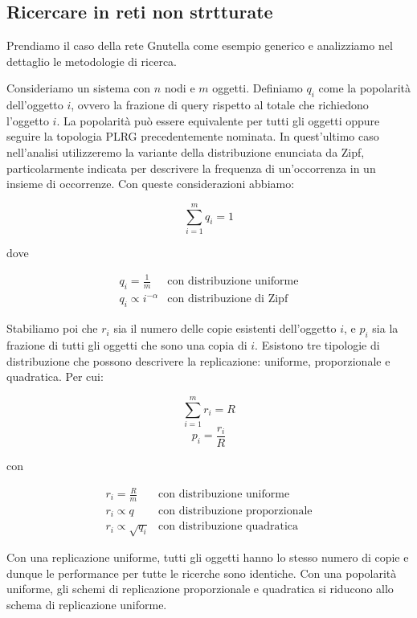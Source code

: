 \subsection{Ricercare in reti non strtturate}\label{ricercare-in-reti-non-strtturate}

Prendiamo il caso della rete Gnutella come esempio generico e analizziamo nel dettaglio le metodologie di ricerca.

Consideriamo un sistema con $n$ nodi e $m$ oggetti. Definiamo $q_i$ come la popolarità dell'oggetto $i$, ovvero la frazione di query rispetto al totale che richiedono l'oggetto $i$. La popolarità può essere equivalente per tutti gli oggetti oppure seguire la topologia PLRG precedentemente nominata. In quest'ultimo caso nell'analisi utilizzeremo la variante della distribuzione enunciata da Zipf, particolarmente indicata per descrivere la frequenza di un'occorrenza in un insieme di occorrenze. 
Con queste considerazioni abbiamo:

\[ \sum^m_{i=1} q_i = 1 \]

dove

\[ \begin{array}{ll} 
    q_i = \frac{1}{m} & \textrm{con distribuzione uniforme} \\
    q_i \propto i^{-\alpha} & \textrm{con distribuzione di Zipf}
    \end{array}
\]

Stabiliamo poi che $r_i$ sia il numero delle copie esistenti dell'oggetto $i$, e $p_i$ sia la frazione di tutti gli oggetti che sono una copia di $i$. Esistono tre tipologie di distribuzione che possono descrivere la replicazione: uniforme, proporzionale e quadratica. Per cui:

\[ \sum^m_{i=1} r_i = R \] \[ p_i = \frac{r_i}{R} \]

con

\[ \begin{array}{ll} 
    r_i = \frac{R}{m} & \textrm{con distribuzione uniforme} \\
    r_i \propto q & \textrm{con distribuzione proporzionale} \\
    r_i \propto \sqrt{q_i} & \textrm{con distribuzione quadratica}
    \end{array}
\]

Con una replicazione uniforme, tutti gli oggetti hanno lo stesso numero di copie e dunque le performance per tutte le ricerche sono identiche. Con una popolarità uniforme, gli schemi di replicazione proporzionale e quadratica si riducono allo schema di replicazione uniforme.

